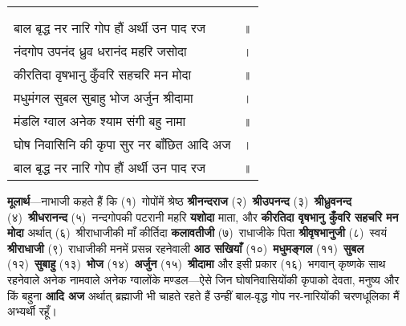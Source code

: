
{
{\bfseries
\setlength{\mylenone}{0pt}
\settowidth{\mylentwo}{}
\setlength{\mylenone}{\maxof{\mylenone}{\mylentwo}}
\settowidth{\mylentwo}{बाल बृद्ध नर नारि गोप हौं अर्थी उन पाद रज}
\setlength{\mylenone}{\maxof{\mylenone}{\mylentwo}}
\settowidth{\mylentwo}{नंदगोप उपनंद ध्रुव धरानंद महरि जसोदा}
\setlength{\mylenone}{\maxof{\mylenone}{\mylentwo}}
\settowidth{\mylentwo}{कीरतिदा वृषभानु कुँवरि सहचरि मन मोदा}
\setlength{\mylenone}{\maxof{\mylenone}{\mylentwo}}
\settowidth{\mylentwo}{मधुमंगल सुबल सुबाहु भोज अर्जुन श्रीदामा}
\setlength{\mylenone}{\maxof{\mylenone}{\mylentwo}}
\settowidth{\mylentwo}{मंडलि ग्वाल अनेक श्याम संगी बहु नामा}
\setlength{\mylenone}{\maxof{\mylenone}{\mylentwo}}
\settowidth{\mylentwo}{घोष निवासिनि की कृपा सुर नर बाँछित आदि अज}
\setlength{\mylenone}{\maxof{\mylenone}{\mylentwo}}
\settowidth{\mylentwo}{बाल बृद्ध नर नारि गोप हौं अर्थी उन पाद रज}
\setlength{\mylenone}{\maxof{\mylenone}{\mylentwo}}
\setlength{\mylentwo}{\baselineskip}
\setlength{\mylenone}{\mylenone + 1pt}
\begin{longtable}[l]{@{\hspace*{\mylen}}>{\setlength\parfillskip{0pt}}p{\mylenone}@{}@{}l@{}}
 & \\[-\the\mylentwo]
\centering{॥ २२ \hspace*{-1.5mm}॥} & \\ \nopagebreak
बाल बृद्ध नर नारि गोप हौं अर्थी उन पाद रज & ॥\\
नंदगोप उपनंद ध्रुव धरानंद महरि जसोदा & ।\\ \nopagebreak
कीरतिदा वृषभानु कुँवरि सहचरि मन मोदा & ॥\\
मधुमंगल सुबल सुबाहु भोज अर्जुन श्रीदामा & ।\\ \nopagebreak
मंडलि ग्वाल अनेक श्याम संगी बहु नामा & ॥\\
घोष निवासिनि की कृपा सुर नर बाँछित आदि अज & ।\\ \nopagebreak
बाल बृद्ध नर नारि गोप हौं अर्थी उन पाद रज & ॥
\end{longtable}
}
}
\begin{sloppypar}\justifying{}
\textbf{मूलार्थ}—नाभाजी कहते हैं कि (१)~गोपोंमें श्रेष्ठ \textbf{श्रीनन्दराज} (२)~\textbf{श्रीउपनन्द} (३)~\textbf{श्रीध्रुवनन्द} (४)~\textbf{श्रीधरानन्द} (५)~नन्दगोपकी पटरानी महरि \textbf{यशोदा} माता, और \textbf{कीरतिदा वृषभानु कुँवरि सहचरि मन मोदा} अर्थात् (६)~श्रीराधाजीकी माँ कीर्तिदा \textbf{कलावतीजी} (७)~राधाजीके पिता \textbf{श्रीवृषभानुजी} (८)~स्वयं \textbf{श्रीराधाजी} (९)~राधाजीकी मनमें प्रसन्न रहनेवाली \textbf{आठ सखियाँ} (१०)~\textbf{मधुमङ्गल} (११)~\textbf{सुबल} (१२)~\textbf{सुबाहु} (१३)~\textbf{भोज} (१४)~\textbf{अर्जुन} (१५)~\textbf{श्रीदामा} और इसी प्रकार (१६)~भगवान् कृष्णके साथ रहनेवाले अनेक नामवाले अनेक ग्वालोंके मण्डल—ऐसे जिन घोष\-निवासियोंकी कृपाको देवता, मनुष्य और किं बहुना \textbf{आदि अज} अर्थात् ब्रह्माजी भी चाहते रहते हैं उन्हीं बाल-वृद्ध गोप नर-नारियोंकी चरण\-धूलिका मैं अभ्यर्थी रहूँ।
\end{sloppypar}
